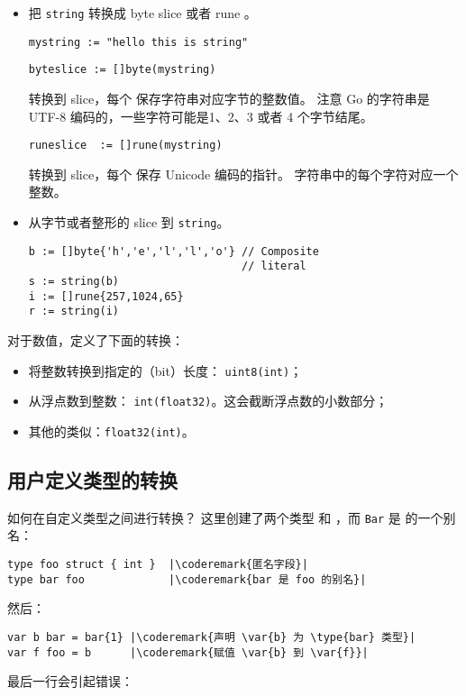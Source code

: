 \begin{itemize}
\item{
把 \lstinline{string} 转换成 byte slice 或者 rune 。
\begin{lstlisting}
mystring := "hello this is string"
\end{lstlisting}

\begin{lstlisting}
byteslice := []byte(mystring)
\end{lstlisting}
转换到  slice，每个  保存字符串对应字节的整数值。
注意 Go 的字符串是 UTF-8 编码的，一些字符可能是1、2、3 或者 4 个字节结尾。
\begin{lstlisting}
runeslice  := []rune(mystring)
\end{lstlisting}
转换到  slice，每个  保存 Unicode 编码的指针。
字符串中的每个字符对应一个整数。
}
\item{
从字节或者整形的 slice 到 \lstinline{string}。
\begin{lstlisting}
b := []byte{'h','e','l','l','o'} // Composite 
                                 // literal
s := string(b)
i := []rune{257,1024,65} 
r := string(i)
\end{lstlisting}
}
\end{itemize}
对于数值，定义了下面的转换：
\begin{itemize}
\item{将整数转换到指定的（bit）长度： 
\lstinline{uint8(int)}；}
\item{从浮点数到整数：
\lstinline{int(float32)}。这会截断浮点数的小数部分；}
\item{其他的类似：\lstinline{float32(int)}。}
\end{itemize}

\subsection{用户定义类型的转换}
如何在自定义类型之间进行转换？
这里创建了两个类型  和 ，而
\lstinline{Bar} 是  的一个别名：
\begin{lstlisting}
type foo struct { int }  |\coderemark{匿名字段}|
type bar foo             |\coderemark{bar 是 foo 的别名}|
\end{lstlisting}

然后：
\begin{lstlisting}
var b bar = bar{1} |\coderemark{声明 \var{b} 为 \type{bar} 类型}|
var f foo = b	   |\coderemark{赋值 \var{b} 到 \var{f}}|
\end{lstlisting}
最后一行会引起错误：

